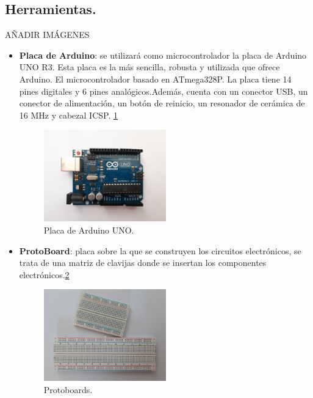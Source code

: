 \subsection{Herramientas.}
AÑADIR IMÁGENES
\begin{itemize}
\item \textbf{Placa de Arduino}\cite{Arduino1,Arduino2}: se utilizará como microcontrolador la placa de Arduino UNO R3. Esta placa es la más sencilla, robusta y utilizada que ofrece Arduino. El microcontrolador basado en ATmega328P. La placa tiene 14 pines digitales y 6 pines analógicos.Además, cuenta con un conector USB, un conector de alimentación, un botón de reinicio, un resonador de cerámica de 16 MHz y cabezal ICSP. \ref{fig:arduino}
\begin{figure}[h!]
    \centering
    \includegraphics[width=0.5\textwidth]{img/imgArduinoUNO.jpg}
    \caption{Placa de Arduino UNO.}
    \label{fig:arduino} %
\end{figure}

\item \textbf{ProtoBoard}: placa sobre la que se construyen los circuitos electrónicos, se trata de una matriz de clavijas donde se insertan los componentes electrónicos.\ref{fig:protoboard}
\begin{figure}[h!]
    \centering
    \includegraphics[width=0.5\textwidth]{img/imgProtoboards.jpg}
    \caption{Protoboards.}
    \label{fig:protoboard} %
\end{figure}


\end{itemize}

